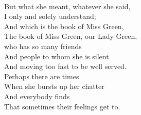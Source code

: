\documentclass[smalldemyvopaper,11pt,twoside,onecolumn,openright,extrafontsizes]{memoir}
\begin{document}
\\But what she meant, whatever she said,
\\I only and solely understand;
\\And which is the book of Miss Green,
\\The book of Miss Green, our Lady Green,
\\who has so many friends
\\And people to whom she is silent
\\And moving too fast to be well served.
\\Perhaps there are times
\\When she bursts up her chatter
\\And everybody finds
\\That sometimes their feelings get to.
\end{document}
